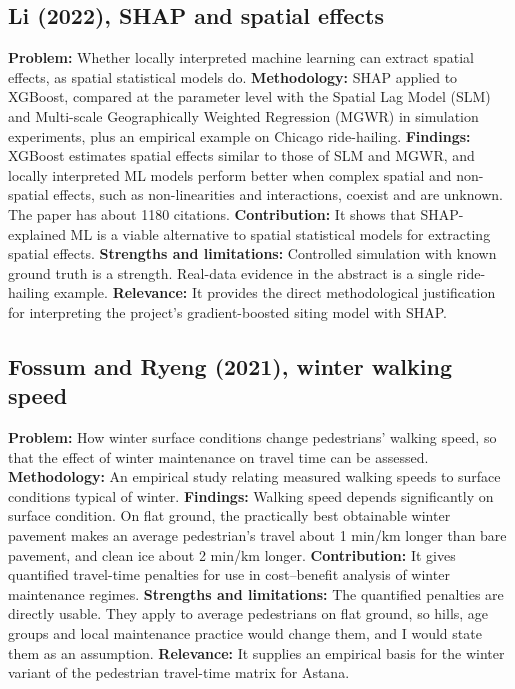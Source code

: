 \documentclass[pdflatex,sn-mathphys-num]{sn-jnl}
\begin{document}
\subsection{Li (2022), SHAP and spatial effects \cite{li2022}}
\textbf{Problem:} Whether locally interpreted machine learning can extract spatial effects, as spatial statistical models do.
\textbf{Methodology:} SHAP applied to XGBoost, compared at the parameter level with the Spatial Lag Model (SLM) and Multi-scale Geographically Weighted Regression (MGWR) in simulation experiments, plus an empirical example on Chicago ride-hailing.
\textbf{Findings:} XGBoost estimates spatial effects similar to those of SLM and MGWR, and locally interpreted ML models perform better when complex spatial and non-spatial effects, such as non-linearities and interactions, coexist and are unknown. The paper has about 1180 citations.
\textbf{Contribution:} It shows that SHAP-explained ML is a viable alternative to spatial statistical models for extracting spatial effects.
\textbf{Strengths and limitations:} Controlled simulation with known ground truth is a strength. Real-data evidence in the abstract is a single ride-hailing example.
\textbf{Relevance:} It provides the direct methodological justification for interpreting the project's gradient-boosted siting model with SHAP.

\subsection{Fossum and Ryeng (2021), winter walking speed \cite{winterwalk2021}}
\textbf{Problem:} How winter surface conditions change pedestrians' walking speed, so that the effect of winter maintenance on travel time can be assessed.
\textbf{Methodology:} An empirical study relating measured walking speeds to surface conditions typical of winter.
\textbf{Findings:} Walking speed depends significantly on surface condition. On flat ground, the practically best obtainable winter pavement makes an average pedestrian's travel about 1 min/km longer than bare pavement, and clean ice about 2 min/km longer.
\textbf{Contribution:} It gives quantified travel-time penalties for use in cost--benefit analysis of winter maintenance regimes.
\textbf{Strengths and limitations:} The quantified penalties are directly usable. They apply to average pedestrians on flat ground, so hills, age groups and local maintenance practice would change them, and I would state them as an assumption.
\textbf{Relevance:} It supplies an empirical basis for the winter variant of the pedestrian travel-time matrix for Astana.
\end{document}
